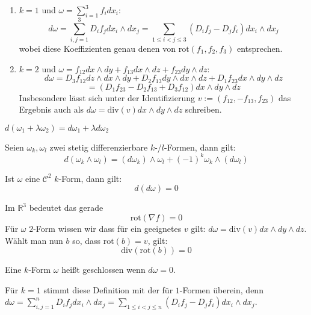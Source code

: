\begin{remark}
	\begin{enumerate}
		\item $k=1$ und $\omega = \sum_{i=1}^3 f_i dx_i$: $$d\omega = \sum_{i,j=1}^3 D_i f_j dx_i\wedge dx_j = \sum_{1\leq i < j \leq 3}(D_i f_j - D_j f_i)dx_i\wedge dx_j$$ wobei diese Koeffizienten genau denen von $\text{rot}(f_1,f_2,f_3)$ entsprechen.
		\item $k=2$ und $\omega = f_{12}dx\wedge dy + f_{13}dx\wedge dz+f_{23}dy\wedge dz$: $$d\omega = D_3 f_{12} dz\wedge dx\wedge dy + D_2 f_{13}dy\wedge dx\wedge dz + D_1 f_{23}dx\wedge dy\wedge dz$$
		$$= (D_1 f_{23} - D_2 f_{13} + D_3 f_{12})dx\wedge dy\wedge dz$$ Insbesondere l\"asst sich unter der Identifizierung $v:=(f_{12},-f_{13},f_{23})$ das Ergebnis auch als $d\omega = \text{div}(v)dx\wedge dy\wedge dz$ schreiben.
	\end{enumerate}
\end{remark}
\begin{lemma}[Linearit\"at]
	$d(\omega_1 + \lambda \omega_2) = d\omega_1 + \lambda d\omega_2$
\end{lemma}

\begin{theorem} Seien $\omega_k,\omega_l$ zwei stetig differenzierbare $k$-/$l$-Formen, dann gilt:
	$$d(\omega_k\wedge\omega_l) = (d\omega_k)\wedge\omega_l+(-1)^k\omega_k\wedge(d\omega_l)$$
\end{theorem}
\begin{theorem}[$d\circ d = 0$]
	Ist $\omega$ eine $\mathcal C^2$ $k$-Form, dann gilt:
	$$d(d\omega)=0$$
\end{theorem}
\begin{remark}
	Im $\mathbb R^3$ bedeutet das gerade $$\text{rot}(\nabla f)=0$$ F\"ur $\omega$ $2$-Form wissen wir dass f\"ur ein geeignetes $v$ gilt: $d\omega = \text{div}(v)dx\wedge dy\wedge dz$. W\"ahlt man nun $b$ so, dass $\text{rot}(b)=v$, gilt: $$\text{div}(\text{rot}(b))=0$$
\end{remark}

\begin{definition}[Geschlossenheit]
	Eine $k$-Form $\omega$ hei\ss t geschlossen wenn $d\omega = 0$.
\end{definition}
\begin{remark}
	Für $k=1$ stimmt diese Definition mit der f\"ur $1$-Formen \"uberein, denn $d\omega = \sum_{i,j=1}^n D_i f_j dx_i\wedge dx_j = \sum_{1\leq i < j \leq n}(D_i f_j - D_j f_i)dx_i\wedge dx_j$.
\end{remark}

